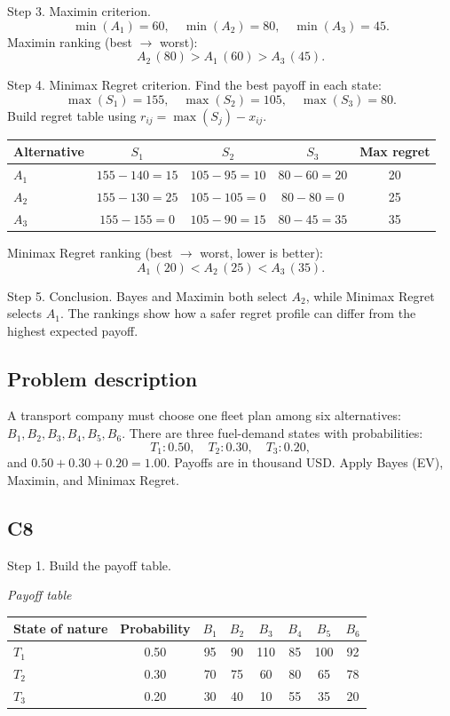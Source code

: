 \begin{ExamProblems}
		Step 3. Maximin criterion.
		\[
		\min(A_1)=60,\quad \min(A_2)=80,\quad \min(A_3)=45.
		\]
		Maximin ranking (best $\to$ worst):
		\[
		A_2\,(80) > A_1\,(60) > A_3\,(45).
		\]

		Step 4. Minimax Regret criterion.
		Find the best payoff in each state:
		\[
		\max(S_1)=155,\quad \max(S_2)=105,\quad \max(S_3)=80.
		\]
		Build regret table using $r_{ij}=\max(S_j)-x_{ij}$.
		\begin{center}
			\begin{tabular}{l c c c c}
				\toprule
				Alternative & $S_1$ & $S_2$ & $S_3$ & Max regret \\
				\midrule
				$A_1$ & $155-140=15$ & $105-95=10$ & $80-60=20$ & 20 \\
				$A_2$ & $155-130=25$ & $105-105=0$ & $80-80=0$ & 25 \\
				$A_3$ & $155-155=0$ & $105-90=15$ & $80-45=35$ & 35 \\
				\bottomrule
			\end{tabular}
		\end{center}
		Minimax Regret ranking (best $\to$ worst, lower is better):
		\[
		A_1\,(20) < A_2\,(25) < A_3\,(35).
		\]

		Step 5. Conclusion.
		Bayes and Maximin both select $A_2$, while Minimax Regret selects $A_1$.
		The rankings show how a safer regret profile can differ from the highest expected payoff.

		\newpage
		\item\leavevmode\par
		\subsection*{Problem description}
		A transport company must choose one fleet plan among six alternatives: $B_1,B_2,B_3,B_4,B_5,B_6$.
		There are three fuel-demand states with probabilities:
		\[
		T_1:0.50,\quad T_2:0.30,\quad T_3:0.20,
		\]
		and $0.50+0.30+0.20=1.00$.
		Payoffs are in thousand USD. Apply Bayes (EV), Maximin, and Minimax Regret.

		\subsection*{C8}
		Step 1. Build the payoff table.
		\begin{center}
			\textit{Payoff table} \\
			\begin{tabular}{l c c c c c c c}
				\toprule
				State of nature & Probability & $B_1$ & $B_2$ & $B_3$ & $B_4$ & $B_5$ & $B_6$ \\
				\midrule
				$T_1$ & 0.50 & 95 & 90 & 110 & 85 & 100 & 92 \\
				$T_2$ & 0.30 & 70 & 75 & 60 & 80 & 65 & 78 \\
				$T_3$ & 0.20 & 30 & 40 & 10 & 55 & 35 & 20 \\
				\bottomrule
			\end{tabular}
		\end{center}


\end{ExamProblems}
